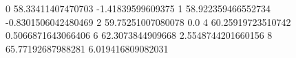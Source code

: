 0 58.33411407470703 -1.41839599609375
1 58.922359466552734 -0.8301506042480469
2 59.75251007080078 0.0
4 60.25919723510742 0.5066871643066406
6 62.3073844909668 2.5548744201660156
8 65.77192687988281 6.019416809082031
